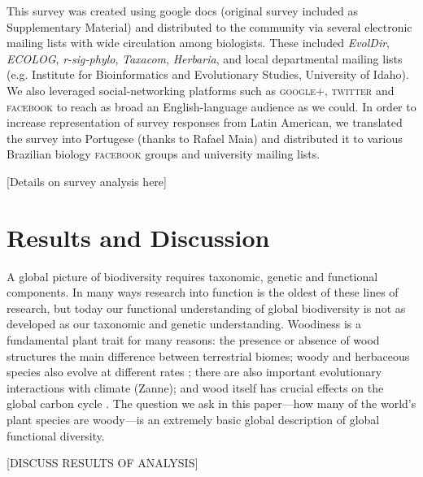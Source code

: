 \documentclass[12pt]{article}
\begin{document}
This survey was created using google docs (original survey included as Supplementary Material) and distributed to the community via several electronic mailing lists with wide circulation among biologists. These included \emph{EvolDir}, \emph{ECOLOG}, \emph{r-sig-phylo}, \emph{Taxacom}, \emph{Herbaria}, and local departmental mailing lists (e.g. Institute for Bioinformatics and Evolutionary Studies, University of Idaho). We also leveraged social-networking platforms such as \textsc{google+}, \textsc{twitter} and \textsc{facebook} to reach as broad an English-language audience as we could. In order to increase representation of survey responses from Latin American, we translated the survey into Portugese (thanks to Rafael Maia) and distributed it to various Brazilian biology \textsc{facebook} groups and university mailing lists.

[Details on survey analysis here]


\section{Results and Discussion}

A global picture of biodiversity requires taxonomic, genetic and functional components.  In many ways research into function is the oldest of these lines of research, but today our functional understanding of global biodiversity is not as developed as our taxonomic and genetic understanding. Woodiness is a fundamental plant trait for many reasons: the presence or absence of wood  structures the main difference between terrestrial biomes; woody and herbaceous species also evolve at different rates \citep{SmithDonoghue};  there are also important evolutionary interactions with climate (Zanne); and wood itself has crucial effects on the global carbon cycle \citep{Cornwellwood}.  The question we ask in this paper---how many of the world's plant species are woody---is an extremely basic global description of global functional diversity.

[DISCUSS RESULTS OF ANALYSIS]
\end{document}
